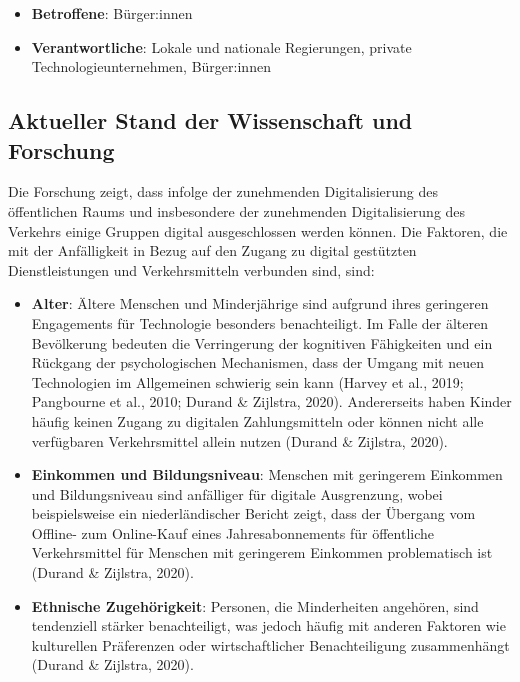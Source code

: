 \documentclass[
]{book}
\providecommand{\tightlist}{%
  \setlength{\itemsep}{0pt}\setlength{\parskip}{0pt}}
\begin{document}
\begin{itemize}
\tightlist
\item
  \textbf{Betroffene}: Bürger:innen
\item
  \textbf{Verantwortliche}: Lokale und nationale Regierungen, private Technologieunternehmen, Bürger:innen
\end{itemize}

\hypertarget{aktueller-stand-der-wissenschaft-und-forschung-6}{%
\subsection*{Aktueller Stand der Wissenschaft und Forschung}\label{aktueller-stand-der-wissenschaft-und-forschung-6}}

Die Forschung zeigt, dass infolge der zunehmenden Digitalisierung des öffentlichen Raums und insbesondere der zunehmenden Digitalisierung des Verkehrs einige Gruppen digital ausgeschlossen werden können. Die Faktoren, die mit der Anfälligkeit in Bezug auf den Zugang zu digital gestützten Dienstleistungen und Verkehrsmitteln verbunden sind, sind:

\begin{itemize}
\tightlist
\item
  \textbf{Alter}: Ältere Menschen und Minderjährige sind aufgrund ihres geringeren Engagements für Technologie besonders benachteiligt. Im Falle der älteren Bevölkerung bedeuten die Verringerung der kognitiven Fähigkeiten und ein Rückgang der psychologischen Mechanismen, dass der Umgang mit neuen Technologien im Allgemeinen schwierig sein kann (Harvey et al., 2019; Pangbourne et al., 2010; Durand \& Zijlstra, 2020). Andererseits haben Kinder häufig keinen Zugang zu digitalen Zahlungsmitteln oder können nicht alle verfügbaren Verkehrsmittel allein nutzen (Durand \& Zijlstra, 2020).
\item
  \textbf{Einkommen und Bildungsniveau}: Menschen mit geringerem Einkommen und Bildungsniveau sind anfälliger für digitale Ausgrenzung, wobei beispielsweise ein niederländischer Bericht zeigt, dass der Übergang vom Offline- zum Online-Kauf eines Jahresabonnements für öffentliche Verkehrsmittel für Menschen mit geringerem Einkommen problematisch ist (Durand \& Zijlstra, 2020).
\item
  \textbf{Ethnische Zugehörigkeit}: Personen, die Minderheiten angehören, sind tendenziell stärker benachteiligt, was jedoch häufig mit anderen Faktoren wie kulturellen Präferenzen oder wirtschaftlicher Benachteiligung zusammenhängt (Durand \& Zijlstra, 2020).
\end{itemize}
\end{document}
